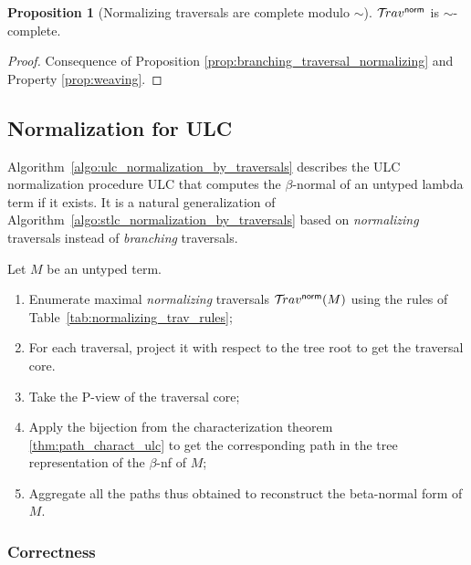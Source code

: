 \documentclass{article}
\theoremstyle{definition}
\newtheorem{proposition}{Proposition}[section]
\newcommand{\normalizing}{{\sf norm}}
\newcommand{\travsetnorm}{\travset^\normalizing}
\begin{document}
\begin{proposition}[Normalizing traversals are complete modulo $\sim$]
\label{prop:normalizing_traversals_simcomplete}
$\travsetnorm$ is $\sim$-complete.
\end{proposition}
\begin{proof}
Consequence of Proposition \ref{prop:branching_traversal_normalizing} and Property \ref{prop:weaving}.
\end{proof}

\subsection{Normalization for ULC}

Algorithm~\ref{algo:ulc_normalization_by_traversals} describes the ULC normalization procedure ULC that computes the $\beta$-normal of an untyped lambda term if it exists. It is a natural generalization of Algorithm~\ref{algo:stlc_normalization_by_traversals} based on \emph{normalizing} traversals instead of \emph{branching} traversals.

\begin{algorithm}[!ht]
\begin{algorithmic}
\caption{Normalization by traversals for the Untyped Lambda Calculus}
\label{algo:ulc_normalization_by_traversals}
Let $M$ be an untyped term.
\begin{enumerate}
  \item Enumerate maximal \emph{normalizing} traversals $\travsetnorm(M)$ using the rules of Table~\ref{tab:normalizing_trav_rules};
  \item For each traversal, project it with respect to the tree root to get the traversal core.
  \item Take the P-view of the traversal core;
  \item Apply the bijection from the characterization theorem \ref{thm:path_charact_ulc} to get the corresponding path in the tree representation of the $\beta$-nf of $M$;
  \item Aggregate all the paths thus obtained to reconstruct the beta-normal form of $M$.
\end{enumerate}
\end{algorithmic}
\end{algorithm}

\subsubsection*{Correctness}
\end{document}
